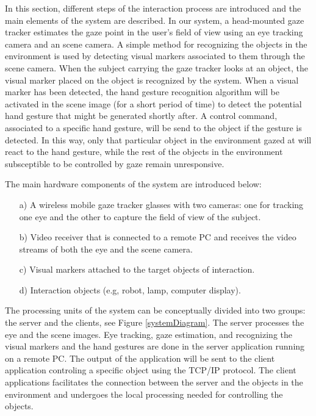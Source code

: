 \documentclass[jou,a4paper,notxfonts]{apa}
\begin{document}
In this section, different steps of the interaction process are introduced and the main elements of the system are described. 
In our system, a head-mounted gaze tracker estimates the gaze point in the user's field of view using an eye tracking camera and an scene camera. A simple method for recognizing the objects in the environment is used by detecting visual markers associated to them through the scene camera. When the subject carrying the gaze tracker looks at an object, the visual marker placed on the object is recognized by the system. When a visual marker has been detected, the hand gesture recognition algorithm will be activated in the scene image (for a short period of time) to detect the potential hand gesture that might be generated shortly after. A control command, associated to a specific hand gesture, will be send to the object if the gesture is detected. In this way, only that particular object in the environment gazed at will react to the hand gesture, while the rest of the objects in the environment subsceptible to be controlled by gaze remain unresponsive.

The main hardware components of the system are introduced below:
\begin{enumerate}
\item[a)] A wireless mobile gaze tracker glasses with two cameras: one for tracking one eye and the other to capture the field of view of the subject. 
\item[b)] Video receiver that is connected to a remote PC and receives the video streams of both the eye and the scene camera.
\item[c)] Visual markers attached to the target objects of interaction. 
\item[d)] Interaction objects (e.g, robot, lamp, computer display).

\end{enumerate}

The processing units of the system can be conceptually divided into two groups: the server and the clients, see Figure \ref{systemDiagram}. The server processes the eye and the scene images. Eye tracking, gaze estimation, and recognizing the visual markers and the hand gestures are done in the server application running on a remote PC. The output of the application will be sent to the client application controling a specific object using the TCP/IP protocol. The client applications facilitates the connection between the server and the objects in the environment and undergoes the local processing needed for controlling the objects. 
\end{document}

